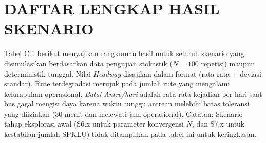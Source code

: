 \cleardoublepage
\chapter{DAFTAR LENGKAP HASIL SKENARIO}

Tabel C.1 berikut menyajikan rangkuman hasil untuk seluruh skenario yang disimulasikan 
berdasarkan data pengujian stokastik ($N=100$ repetisi) maupun deterministik tunggal.
Nilai \textit{Headway} disajikan dalam format (rata-rata $\pm$ deviasi standar).
Rute terdegradasi merujuk pada jumlah rute yang mengalami kelumpuhan operasional.
\textit{Batal Antre/hari} adalah rata-rata kejadian per hari saat bus gagal mengisi daya 
karena waktu tunggu antrean melebihi batas toleransi yang diizinkan (30 menit dan melewati jam operasional).
Catatan: Skenario tahap eksplorasi awal (S6.x untuk parameter konvergensi $N$, dan S7.x untuk kestabilan jumlah SPKLU) tidak ditampilkan pada tabel ini untuk keringkasan.

